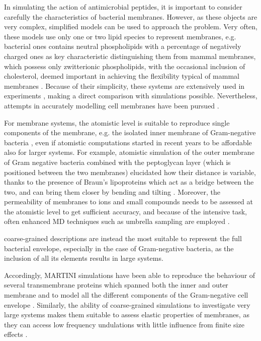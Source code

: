 \documentclass[graybox]{svmult}
\begin{document}
In simulating the action of antimicrobial peptides, it is important to consider carefully the characteristics of bacterial membranes. However, as these objects are very complex, simplified models can be used to approach the problem.
%
Very often, these models use only one or two lipid species to represent membranes, e.g. bacterial ones contains neutral phospholipids with a percentage of negatively charged ones \cite{Lipkin2017,Wang2012,Zhao2018,Chen2019} as key characteristic distinguishing them from mammal membranes, which possess only zwitterionic phospholipids, with the occasional inclusion of cholesterol, deemed important in achieving the flexibility typical of mammal membranes \cite{Lipkin2017,Wang2012,Zhao2018,Chen2019,Risselada2008}.
%
Because of their simplicity, these systems are extensively used in experiments \cite{Castelletto2016,Tang2009,Glukhov2005}, making a direct comparison with simulations possible. Nevertheless, attempts in accurately modelling cell membranes have been pursued \cite{Khalid2019}.

For membrane systems, the atomistic level is suitable to reproduce single components of the membrane, e.g. the isolated inner membrane of Gram-negative bacteria \cite{Piggot2011}, even if atomistic computations started in recent years to be affordable also for larger systems.
%
For example, atomistic simulation of the outer membrane of Gram negative bacteria combined with the peptoglycan layer (which is positioned between the two membranes) elucidated how their distance is variable, thanks to the presence of Braun's lipoproteins which act as a bridge between the two, and can bring them closer by bending and tilting \cite{Samsudin2017}.
%
Moreover, the permeability of membranes to ions and small compounds needs to be assessed at the atomistic level to get sufficient accuracy, and because of the intensive task, often enhanced MD techniques such as umbrella sampling are employed \cite{Carpenter2016}.

coarse-grained descriptions are instead the most suitable to represent the full bacterial envelope, especially in the case of Gram-negative bacteria, as the inclusion of all its elements results in large systems.

Accordingly, MARTINI simulations have been able to reproduce the behaviour of several transmembrane proteins which spanned both the inner and outer membrane \cite{Hsu2017} and to model all the different components of the Gram-negative cell envelope \cite{Khalid2019}.
%
Similarly, the ability of coarse-grained simulations to investigate very large systems makes them suitable to assess elastic properties of membranes, as they can access low frequency undulations with little influence from finite size effects \cite{Fowler2016}.
\end{document}
